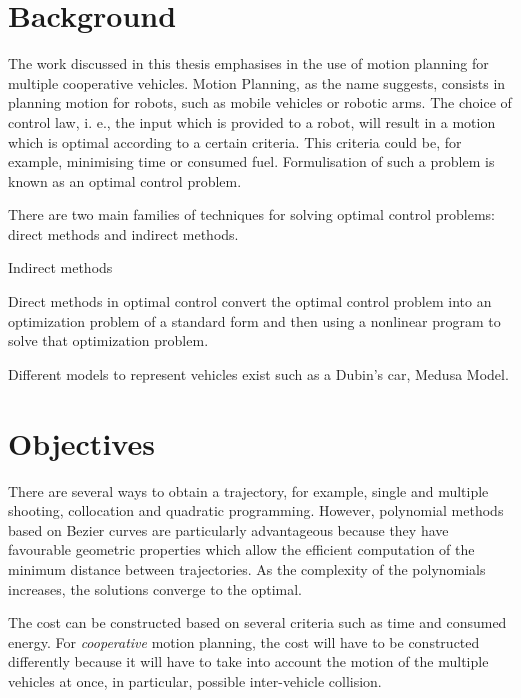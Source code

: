 \section{Background}

\par The work discussed in this thesis emphasises in the use of motion planning for multiple cooperative vehicles. Motion Planning, as the name suggests, consists in planning motion for robots, such as mobile vehicles or robotic arms. The choice of control law, i. e., the input which is provided to a robot, will result in a motion which is optimal according to a certain criteria. This criteria could be, for example, minimising time or consumed fuel. Formulisation of such a problem is known as an optimal control problem.
\par There are two main families of techniques for solving optimal control problems: direct methods and indirect methods.
\par Indirect methods 
\par Direct methods in optimal control convert the optimal control problem into an optimization problem of a standard form and then using a nonlinear program to solve that optimization problem. 

\par Different models to represent vehicles exist such as a Dubin's car, Medusa Model.



\section{Objectives}


\par There are several ways to obtain a trajectory, for example, single and multiple shooting, collocation and quadratic programming. However, polynomial methods based on Bezier curves are particularly advantageous because they have favourable geometric properties which allow the efficient computation of the minimum distance between trajectories. As the complexity of the polynomials increases, the solutions converge to the optimal.
\par The cost can be constructed based on several criteria such as time and consumed energy. For \textit{cooperative} motion planning, the cost will have to be constructed differently because it will have to take into account the motion of the multiple vehicles at once, in particular, possible inter-vehicle collision.



